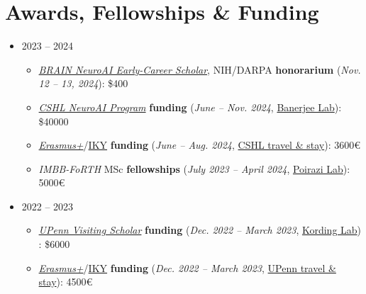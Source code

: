 \documentclass[letterpaper,11pt]{article}
\begin{document}
\section{Awards, Fellowships \& Funding}
\begin{itemize}
  \item 2023 -- 2024
    \setlength\itemsep{-0.3em}
    \begin{itemize}
      \item \textit{\hyperref[BrainNeuroAIWorkshop2024PosterMarker]{BRAIN NeuroAI Early-Career Scholar}}, NIH/DARPA \textbf{honorarium} (\textit{Nov. 12 -- 13, 2024}): \$400
      \item \textit{\href{https://www.cshl.edu/research/neuroscience/neuroai/}{CSHL NeuroAI Program}} \textbf{funding} (\textit{June -- Nov. 2024}, \hyperref[BanerjeeLabMarker]{Banerjee Lab})\label{CSHLNeuroAIResearchInternFundingMarker}: \$40000
      \item \textit{\href{https://erasmus-plus.ec.europa.eu/opportunities/opportunities-for-individuals/students/traineeships-abroad-for-students}{Erasmus+}}/\href{https://www.iky.gr/en/discover-erasmus}{IKY} \textbf{funding} (\textit{June -- Aug. 2024}, \hyperref[BanerjeeLabMarker]{CSHL travel \& stay}): 3600\euro
      \item \textit{IMBB-FoRTH} MSc \textbf{fellowships} (\textit{July 2023 -- April 2024}, \hyperref[PoiraziLabMarker]{Poirazi Lab})\label{IMBBFoRTHFellowshipMarker}: 5000\euro
    \end{itemize}
  \item 2022 -- 2023
    \setlength\itemsep{-0.3em}
    \begin{itemize}
        \item \textit{\href{https://global.upenn.edu/isss/j1scholar}{UPenn Visiting Scholar}} \textbf{funding} (\textit{Dec. 2022 -- March 2023}, \hyperref[KordingLabMarker]{Kording Lab}) \label{UPennVisitingScholarFundingMarker}: \$6000
        \item \textit{\href{https://erasmus-plus.ec.europa.eu/opportunities/opportunities-for-individuals/students/traineeships-abroad-for-students}{Erasmus+}}/\href{https://www.iky.gr/en/discover-erasmus}{IKY} \textbf{funding} (\textit{Dec. 2022 -- March 2023}, \hyperref[KordingLabMarker]{UPenn travel \& stay}): 4500\euro
    \end{itemize}
\end{itemize}

\end{document}
